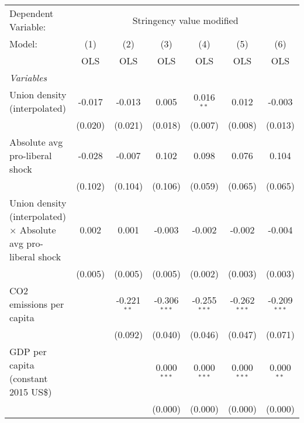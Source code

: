 
\begingroup
\centering
\begin{tabular}{lcccccc}
   \toprule
   Dependent Variable: & \multicolumn{6}{c}{Stringency value modified}\\
   Model:                                                                & (1)     & (2)           & (3)            & (4)            & (5)            & (6)\\  
                                                                         &  OLS    & OLS           & OLS            & OLS            & OLS            & OLS\\  
   \midrule
   \emph{Variables}\\
   Union density (interpolated)                                          & -0.017  & -0.013        & 0.005          & 0.016$^{**}$   & 0.012          & -0.003\\   
                                                                         & (0.020) & (0.021)       & (0.018)        & (0.007)        & (0.008)        & (0.013)\\   
   Absolute avg pro-liberal shock                                        & -0.028  & -0.007        & 0.102          & 0.098          & 0.076          & 0.104\\   
                                                                         & (0.102) & (0.104)       & (0.106)        & (0.059)        & (0.065)        & (0.065)\\   
   Union density (interpolated) $\times$ Absolute avg pro-liberal shock  & 0.002   & 0.001         & -0.003         & -0.002         & -0.002         & -0.004\\   
                                                                         & (0.005) & (0.005)       & (0.005)        & (0.002)        & (0.003)        & (0.003)\\   
   CO2 emissions per capita                                              &         & -0.221$^{**}$ & -0.306$^{***}$ & -0.255$^{***}$ & -0.262$^{***}$ & -0.209$^{***}$\\   
                                                                         &         & (0.092)       & (0.040)        & (0.046)        & (0.047)        & (0.071)\\   
   GDP per capita (constant 2015 US\$)                                   &         &               & 0.000$^{***}$  & 0.000$^{***}$  & 0.000$^{***}$  & 0.000$^{**}$\\   
                                                                         &         &               & (0.000)        & (0.000)        & (0.000)        & (0.000)\\   

\end{tabular}
